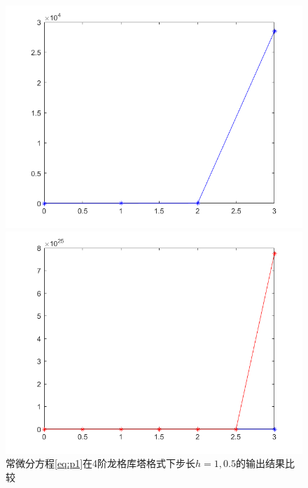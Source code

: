 \documentclass[UTF8]{ctexart}
\begin{document}
\begin{figure}[H]
	\centering
	\begin{minipage}[c]{0.5\textwidth}
		\centering
		\includegraphics[width=0.7\columnwidth]{figures/p1heun1.png}
	\end{minipage}%
	\begin{minipage}[c]{0.5\textwidth}
		\centering
		\includegraphics[width=0.7\columnwidth]{figures/p1heun2.png}
	\end{minipage}
	\caption{常微分方程\ref{eq:p1}在4阶龙格库塔格式下步长$h=1, 0.5$的输出结果比较}
\end{figure}
\end{document}
